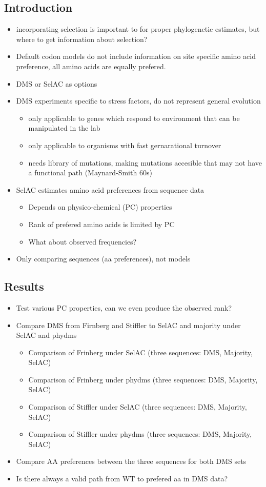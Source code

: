 \documentclass[12pt]{article}
\begin{document}
\subsection*{Introduction}
\begin{itemize}
	\item incorporating selection is important to for proper phylogenetic estimates, but where to get information about selection?	
	\item Default codon models do not include information on site specific amino acid preference, all amino acids are equally prefered.
	\item DMS or SelAC as options
	\item DMS experiments specific to stress factors, do not represent general evolution
	\begin{itemize}
		\item only applicable to genes which respond to environment that can be manipulated in the lab
		\item only applicable to organisms with fast gernarational turnover
		\item needs library of mutations, making mutations accesible that may not have a functional path (Maynard-Smith 60s)
	\end{itemize}
	\item SelAC estimates amino acid preferences from sequence data
	\begin{itemize}
		\item Depends on physico-chemical (PC) properties
		\item Rank of prefered amino acids is limited by PC
		\item What about observed frequencies?
	\end{itemize}
	\item Only comparing sequences (aa preferences), not models
\end{itemize}

\subsection*{Results}
\begin{itemize}
	\item Test various PC properties, can we even produce the observed rank?
	\item Compare DMS from Firnberg and Stiffler to SelAC and majority under SelAC and phydms
	\begin{itemize}
		\item Comparison of Frinberg under SelAC (three sequences: DMS, Majority, SelAC)
		\item Comparison of Frinberg under phydms (three sequences: DMS, Majority, SelAC)
		\item Comparison of Stiffler under SelAC (three sequences: DMS, Majority, SelAC)
		\item Comparison of Stiffler under phydms (three sequences: DMS, Majority, SelAC)
	\end{itemize}
	\item Compare AA preferences between the three sequences for both DMS sets
	\item Is there always a valid path from WT to prefered aa in DMS data?
\end{itemize}
\end{document}

